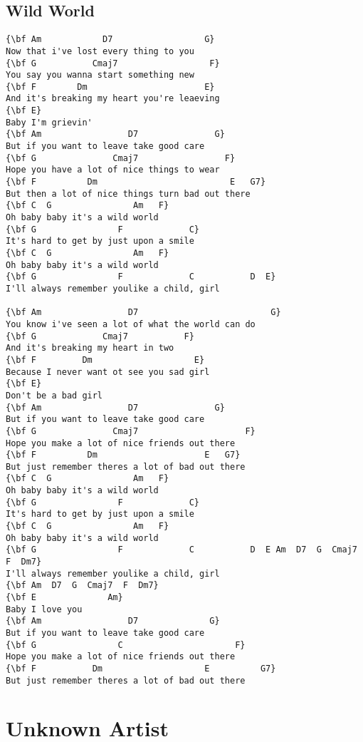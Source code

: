 \documentclass[a4paper]{article}
\begin{document}
\subsection{Wild World} %
\label{sub:Wild Worl}
\begin{Verbatim}[commandchars=\\\{\}]
{\bf Am            D7                  G}
Now that i've lost every thing to you
{\bf G           Cmaj7                  F}
You say you wanna start something new
{\bf F        Dm                       E}
And it's breaking my heart you're leaeving
{\bf E}
Baby I'm grievin'
{\bf Am                 D7               G}
But if you want to leave take good care
{\bf G               Cmaj7                 F}
Hope you have a lot of nice things to wear
{\bf F          Dm                          E   G7}
But then a lot of nice things turn bad out there
{\bf C  G                Am   F}
Oh baby baby it's a wild world
{\bf G                F             C}
It's hard to get by just upon a smile
{\bf C  G                Am   F}
Oh baby baby it's a wild world
{\bf G                F             C           D  E}
I'll always remember youlike a child, girl

{\bf Am                 D7                          G}
You know i've seen a lot of what the world can do
{\bf G             Cmaj7           F}
And it's breaking my heart in two
{\bf F         Dm                    E}
Because I never want ot see you sad girl
{\bf E}
Don't be a bad girl
{\bf Am                 D7               G}
But if you want to leave take good care
{\bf G               Cmaj7                     F}
Hope you make a lot of nice friends out there
{\bf F          Dm                     E   G7}
But just remember theres a lot of bad out there
{\bf C  G                Am   F}
Oh baby baby it's a wild world
{\bf G                F             C}
It's hard to get by just upon a smile
{\bf C  G                Am   F}
Oh baby baby it's a wild world
{\bf G                F             C           D  E Am  D7  G  Cmaj7  F  Dm7}
I'll always remember youlike a child, girl
{\bf Am  D7  G  Cmaj7  F  Dm7}
{\bf E              Am}
Baby I love you
{\bf Am                 D7              G}
But if you want to leave take good care
{\bf G                C                      F}
Hope you make a lot of nice friends out there
{\bf F           Dm                    E          G7}
But just remember theres a lot of bad out there
\end{Verbatim}
\newpage
\section{Unknown Artist} %
\label{sec:Unknown Artis}
\end{document}
